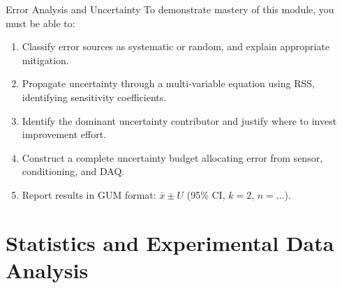 \documentclass[11pt,letterpaper,twoside,openany]{book}
\begin{document}
\begin{masterycheckbox}{Error Analysis and Uncertainty}
To demonstrate mastery of this module, you must be able to:
\begin{enumerate}[nosep,leftmargin=1.5em]
\item Classify error sources as systematic or random, and explain appropriate mitigation.
\item Propagate uncertainty through a multi-variable equation using RSS, identifying sensitivity coefficients.
\item Identify the dominant uncertainty contributor and justify where to invest improvement effort.
\item Construct a complete uncertainty budget allocating error from sensor, conditioning, and DAQ.
\item Report results in GUM format: $\bar{x} \pm U$ (95\% CI, $k=2$, $n = \ldots$).
\end{enumerate}
\end{masterycheckbox}

\chapter{Statistics and Experimental Data Analysis}
\label{ch:stats}
\end{document}
